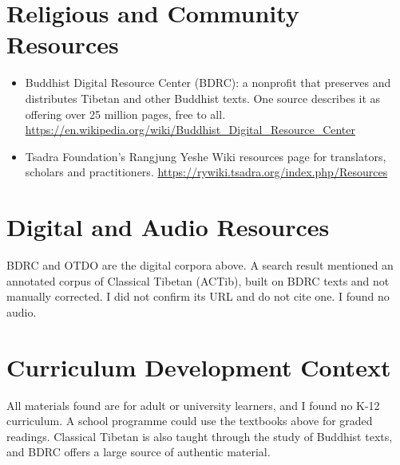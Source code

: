 \documentclass[12pt]{article}
\begin{document}
\section{Religious and Community Resources}
\begin{itemize}
\item Buddhist Digital Resource Center (BDRC): a nonprofit that preserves and distributes Tibetan and other Buddhist texts. One source describes it as offering over 25 million pages, free to all. \url{https://en.wikipedia.org/wiki/Buddhist_Digital_Resource_Center}
\item Tsadra Foundation's Rangjung Yeshe Wiki resources page for translators, scholars and practitioners. \url{https://rywiki.tsadra.org/index.php/Resources}
\end{itemize}

\section{Digital and Audio Resources}
BDRC and OTDO are the digital corpora above. A search result mentioned an annotated corpus of Classical Tibetan (ACTib), built on BDRC texts and not manually corrected. I did not confirm its URL and do not cite one. I found no audio.

\section{Curriculum Development Context}
All materials found are for adult or university learners, and I found no K-12 curriculum. A school programme could use the textbooks above for graded readings. Classical Tibetan is also taught through the study of Buddhist texts, and BDRC offers a large source of authentic material.
\end{document}
